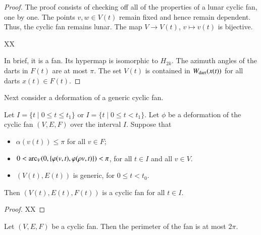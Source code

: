 \begin{proof}  The proof consists of checking off all of the properties of a lunar cyclic fan, one by one.  The points $v,w\in V(t)$ remain fixed and hence remain dependent.  Thus, the cyclic fan remains lunar.  The map $V\to V(t)$, $v\mapsto v(t)$ is bijective.    

XX 

In brief, it is a fan.  Its hypermap is isomorphic to $H_{2k}$.  The azimuth angles of the darts in $F(t)$ are at most $\pi$.  The set $V(t)$ is contained in $W_{\text{dart}}(x(t))$ for all darts $x(t)\in F(t)$.
\end{proof}

Next  consider a deformation of a generic cyclic fan.



\begin{lemma} Let $I = \{t\mid 0\le t\le t_1\}$ or $I=\{t\mid 0\le t < t_1\}$.  Let $\phi$ be a deformation of the cyclic fan $(V,E,F)$ over
the interval $I$.    Suppose that 
\begin{itemize} 
\item $\alpha(v(t))\le \pi$ for all $v\in F$;
\item $0 < \operatorname{arc}_V(0,\{\varphi(v,t),\varphi(\rho v,t)\}) < \pi$, for all $t\in I$ and all $v\in V$.
\item $(V(t),E(t))$ is generic, for $0\le t<t_0$.
\end{itemize}
Then $(V(t),E(t),F(t))$ is a cyclic fan for all $t\in I$.
\end{lemma}

\begin{proof}
XX
\end{proof}






\begin{lemma}
Let $(V,E,F)$ be a cyclic fan.  Then the perimeter of the fan is at most $2\pi$.
\end{lemma}

